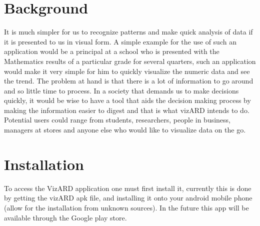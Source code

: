 \documentclass[a4paper,12pt]{article}
\begin{document}
\newpage
\section{Background}

It is much simpler for us to recognize patterns and make quick analysis of data if it is presented to us in visual form. A simple example for the use of such an application would be a principal at a school who is presented with the Mathematics results of a particular grade for several quarters, such an application would make it very simple for him to quickly visualize the numeric data and see the trend.
\newline
\newline
The problem at hand is that there is a lot of information to go around and so little time to process. In a society that demands us to make decisions quickly, it would be wise to have a tool that aids the decision making process by making the information easier to digest and that is what vizARD intends to do.
\newline
\newline
Potential users could range from students, researchers, people in business, managers at stores and anyone else who would like to visualize data on the go.
		

\newpage

\section{Installation}
To access the VizARD application one must first install it, currently this is done by getting the vizARD apk file, and installing it onto your android mobile phone (allow for the installation from unknown sources). In the future this app will be available through the Google play store.

\end{document}

